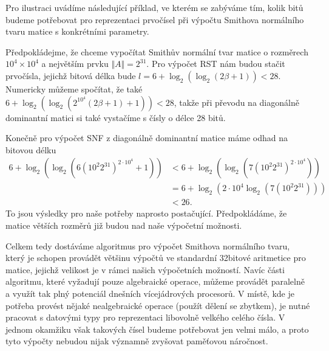 Pro ilustraci uvádíme následující příklad, ve kterém se zabýváme tím, kolik bitů 
budeme potřebovat pro reprezentaci prvočísel při výpočtu Smithova
normálního tvaru matice s konkrétními parametry.

\begin{pri}
Předpokládejme, že chceme vypočítat Smithův normální tvar matice o rozměrech
$ 10^4 \times 10^4 $ a největším prvku $ \Vert A \Vert = 2^{31} $. Pro výpočet 
RST nám budou stačit prvočísla, jejichž bitová délka bude 
$ l = 6 + \log_2(\log_2(2 \beta + 1)) < 28 $. Numericky můžeme spočítat, že také
$ 6 + \log_2(\log_2(2^{10^4} (2 \beta + 1) + 1)) < 28 $, takže při převodu na diagonálně
dominantní matici si také vystačíme s čísly o délce 28 bitů.

Konečně pro výpočet SNF z diagonálně dominantní matice máme odhad na bitovou 
délku 
\begin{align*}
    6 + \log_2(\log_2(6 (10^{2} 2^{31})^{2 \cdot 10^4} + 1)) 
        & < 6 + \log_2(\log_2(7 (10^{2} 2^{31})^{2 \cdot 10^4})) \\
        & = 6 + \log_2(2 \cdot 10^4 \log_2(7 (10^{2} 2^{31})))   \\
        & < 26.
\end{align*}
To jsou výsledky pro naše potřeby naprosto postačující. Předpokládáme, 
že matice větších rozměrů již budou nad naše výpočetní možnosti.
\end{pri}

Celkem tedy dostáváme algoritmus pro výpočet Smithova normálního tvaru, který
je schopen provádět většinu výpočtů ve standardní 32bitové aritmetice pro 
matice, jejichž velikost je v rámci našich výpočetních možností. Navíc části
algoritmu, které vyžadují pouze algebraické operace, můžeme provádět
paralelně a využít tak plný potenciál dnešních vícejádrových procesorů.
V místě, kde je potřeba provést nějaké nealgebraické operace (použít dělení se zbytkem),
je nutné pracovat s datovými typy pro reprezentaci libovolně velkého celého
čísla. V jednom okamžiku však takových čísel budeme potřebovat jen velmi málo, 
a proto tyto výpočty nebudou nijak významně zvyšovat paměťovou náročnost.

